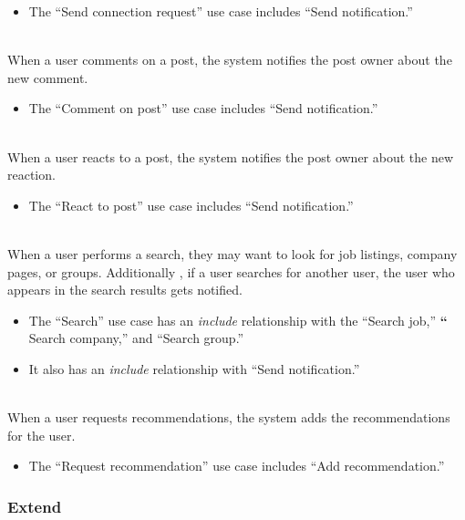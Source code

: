 \begin{itemize}
\item
The ``Send connection request'' use case includes ``Send notification.''
\end{itemize}
\\
When a user comments on a post, the system notifies the post owner about the new comment.

\begin{itemize}
\item
The ``Comment on post'' use case includes ``Send notification.''
\end{itemize}
\\
When a user reacts to a post, the system notifies the post owner about the new reaction.

\begin{itemize}
\item
The ``React to post'' use case includes ``Send notification.''
\end{itemize}
\\
When a user performs a search, they may want to look for job listings, company pages, or groups. Additionally , if a user searches for another user, the user who appears in the search results gets notified.

\begin{itemize}
\item
The ``Search'' use case has an \emph{include} relationship with the ``Search job,'' \textbf{``} Search company,'' and ``Search group.''
\item
It also has an \emph{include} relationship with ``Send notification.''
\end{itemize}
\\
When a user requests recommendations, the system adds the recommendations for the user.

\begin{itemize}
\item
The ``Request recommendation'' use case includes ``Add recommendation.''
\end{itemize}

\subsubsection{Extend}\label{KullxF-4m0wUXBEwK-zlY}

